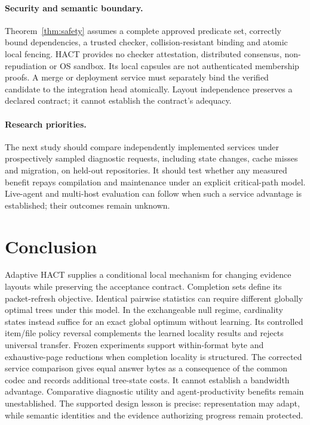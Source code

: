 \paragraph{Security and semantic boundary.}
Theorem~\ref{thm:safety} assumes a complete approved predicate set, correctly
bound dependencies, a trusted checker, collision-resistant binding and atomic
local fencing. HACT provides no checker attestation, distributed consensus,
non-repudiation or OS sandbox. Its local capsules are not authenticated
membership proofs. A merge or deployment service must separately bind the
verified candidate to the integration head atomically. Layout independence
preserves a declared contract; it cannot establish the contract's adequacy.

\paragraph{Research priorities.}
The next study should compare independently implemented services under
prospectively sampled diagnostic requests, including state changes, cache
misses and migration, on held-out repositories. It should test whether any
measured benefit repays compilation and maintenance under an explicit
critical-path model. Live-agent and multi-host evaluation can follow when
such a service advantage is established; their outcomes remain unknown.

\section{Conclusion}\label{sec:conclusion}
Adaptive HACT supplies a conditional local mechanism for changing evidence
layouts while preserving the acceptance contract. Completion sets define its
packet-refresh objective. Identical pairwise statistics can require different
globally optimal trees under this model. In the exchangeable null regime,
cardinality states instead suffice for an exact global optimum without
learning. Its controlled item/file policy reversal complements the learned
locality results and rejects universal transfer. Frozen experiments support within-format
byte and exhaustive-page reductions when completion locality is structured.
The corrected service comparison gives equal answer bytes as a consequence
of the common codec and records additional tree-state costs. It cannot
establish a bandwidth advantage. Comparative diagnostic utility and
agent-productivity benefits remain unestablished. The supported design lesson is precise: representation
may adapt, while semantic identities and the evidence authorizing progress
remain protected.
